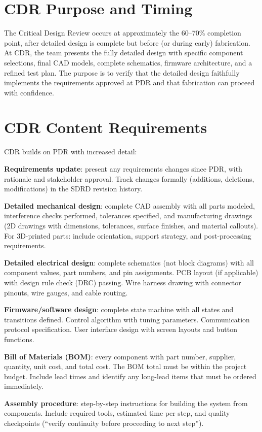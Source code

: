 \documentclass[11pt,letterpaper,twoside,openany]{book}
\begin{document}
\section{CDR Purpose and Timing}
The Critical Design Review occurs at approximately the 60--70\% completion point, after detailed design is complete but before (or during early) fabrication. At CDR, the team presents the fully detailed design with specific component selections, final CAD models, complete schematics, firmware architecture, and a refined test plan. The purpose is to verify that the detailed design faithfully implements the requirements approved at PDR and that fabrication can proceed with confidence.

\section{CDR Content Requirements}
CDR builds on PDR with increased detail:

\textbf{Requirements update}: present any requirements changes since PDR, with rationale and stakeholder approval. Track changes formally (additions, deletions, modifications) in the SDRD revision history.

\textbf{Detailed mechanical design}: complete CAD assembly with all parts modeled, interference checks performed, tolerances specified, and manufacturing drawings (2D drawings with dimensions, tolerances, surface finishes, and material callouts). For 3D-printed parts: include orientation, support strategy, and post-processing requirements.

\textbf{Detailed electrical design}: complete schematics (not block diagrams) with all component values, part numbers, and pin assignments. PCB layout (if applicable) with design rule check (DRC) passing. Wire harness drawing with connector pinouts, wire gauges, and cable routing.

\textbf{Firmware/software design}: complete state machine with all states and transitions defined. Control algorithm with tuning parameters. Communication protocol specification. User interface design with screen layouts and button functions.

\textbf{Bill of Materials (BOM)}: every component with part number, supplier, quantity, unit cost, and total cost. The BOM total must be within the project budget. Include lead times and identify any long-lead items that must be ordered immediately.

\textbf{Assembly procedure}: step-by-step instructions for building the system from components. Include required tools, estimated time per step, and quality checkpoints (``verify continuity before proceeding to next step'').
\end{document}
